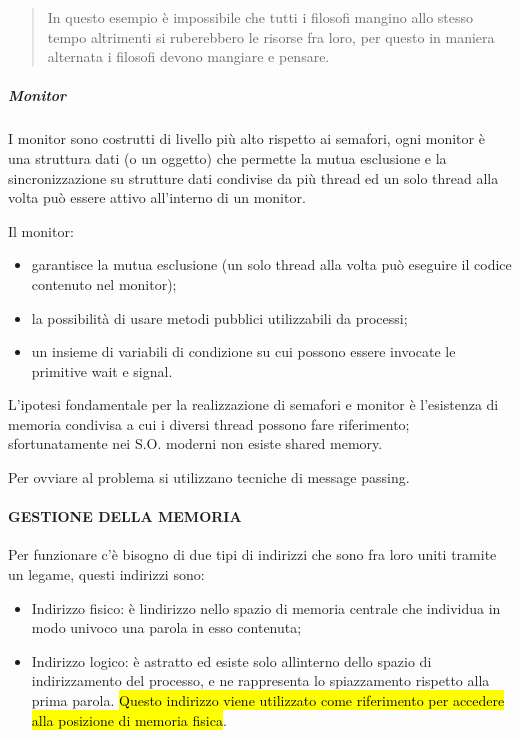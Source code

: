 \begin{quote}
In questo esempio è impossibile che tutti i filosofi mangino allo stesso
tempo altrimenti si ruberebbero le risorse fra loro, per questo in
maniera alternata i filosofi devono mangiare e pensare.
\end{quote}

\subparagraph{\texorpdfstring{\emph{Monitor}}{Monitor}}\label{monitor}

I monitor sono costrutti di livello più alto rispetto ai semafori, ogni
monitor è una struttura dati (o un oggetto) che permette la mutua
esclusione e la sincronizzazione su strutture dati condivise da più
thread ed un solo thread alla volta può essere attivo all'interno di un
monitor.

Il monitor:

\begin{itemize}
\item
  garantisce la mutua esclusione (un solo thread alla volta può eseguire
  il codice contenuto nel monitor);
\item
  la possibilità di usare metodi pubblici utilizzabili da processi;
\item
  un insieme di variabili di condizione su cui possono essere invocate
  le primitive wait e signal.
\end{itemize}

L'ipotesi fondamentale per la realizzazione di semafori e monitor è
l'esistenza di memoria condivisa a cui i diversi thread possono fare
riferimento; sfortunatamente nei S.O. moderni non esiste shared memory.

Per ovviare al problema si utilizzano tecniche di message passing.

\paragraph{GESTIONE DELLA MEMORIA}\label{gestione-della-memoria}

Per funzionare c'è bisogno di due tipi di indirizzi che sono fra loro
uniti tramite un legame, questi indirizzi sono:

\begin{itemize}
\item
  Indirizzo fisico: è l\textquotesingle indirizzo nello spazio di
  memoria centrale che individua in modo univoco una parola in esso
  contenuta;
\item
  Indirizzo logico: è astratto ed esiste solo
  all\textquotesingle interno dello spazio di indirizzamento del
  processo, e ne rappresenta lo spiazzamento rispetto alla prima parola.
  \hl{Questo indirizzo viene utilizzato come riferimento per accedere
  alla posizione di memoria fisica}.
\end{itemize}

